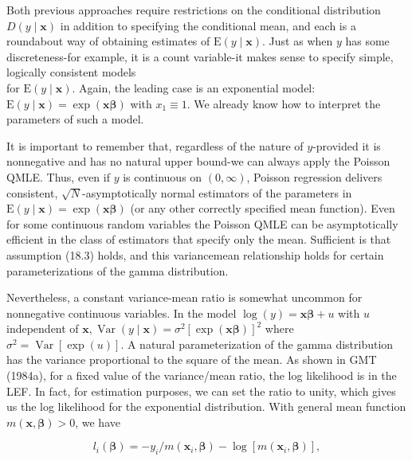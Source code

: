 \documentclass[10pt]{article}
\begin{document}
Both previous approaches require restrictions on the conditional distribution $D(y \mid \mathbf{x})$ in addition to specifying the conditional mean, and each is a roundabout way of obtaining estimates of $\mathrm{E}(y \mid \mathbf{x})$. Just as when $y$ has some discreteness-for example, it is a count variable-it makes sense to specify simple, logically consistent models\\
for $\mathrm{E}(y \mid \mathbf{x})$. Again, the leading case is an exponential model: $\mathrm{E}(y \mid \mathbf{x})=\exp (\mathbf{x} \boldsymbol{\beta})$ with $x_{1} \equiv 1$. We already know how to interpret the parameters of such a model.

It is important to remember that, regardless of the nature of $y$-provided it is nonnegative and has no natural upper bound-we can always apply the Poisson QMLE. Thus, even if $y$ is continuous on $(0, \infty)$, Poisson regression delivers consistent, $\sqrt{N}$-asymptotically normal estimators of the parameters in $\mathrm{E}(y \mid \mathbf{x})=\exp (\mathbf{x} \boldsymbol{\beta})$ (or any other correctly specified mean function). Even for some continuous random variables the Poisson QMLE can be asymptotically efficient in the class of estimators that specify only the mean. Sufficient is that assumption (18.3) holds, and this variancemean relationship holds for certain parameterizations of the gamma distribution.

Nevertheless, a constant variance-mean ratio is somewhat uncommon for nonnegative continuous variables. In the model $\log (y)=\mathbf{x} \boldsymbol{\beta}+u$ with $u$ independent of $\mathbf{x}, \operatorname{Var}(y \mid \mathbf{x})=\sigma^{2}[\exp (\mathbf{x} \boldsymbol{\beta})]^{2}$ where $\sigma^{2}=\operatorname{Var}[\exp (u)]$. A natural parameterization of the gamma distribution has the variance proportional to the square of the mean. As shown in GMT (1984a), for a fixed value of the variance/mean ratio, the log likelihood is in the LEF. In fact, for estimation purposes, we can set the ratio to unity, which gives us the log likelihood for the exponential distribution. With general mean function $m(\mathbf{x}, \boldsymbol{\beta})>0$, we have


\begin{equation*}
l_{i}(\boldsymbol{\beta})=-y_{i} / m\left(\mathbf{x}_{i}, \boldsymbol{\beta}\right)-\log \left[m\left(\mathbf{x}_{i}, \boldsymbol{\beta}\right)\right], \tag{18.35}
\end{equation*}
\end{document}
